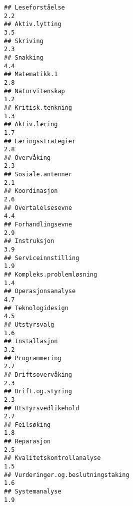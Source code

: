 \documentclass[
]{article}
\begin{document}
\begin{verbatim}
## Leseforståelse                                                                   2.2
## Aktiv.lytting                                                                    3.5
## Skriving                                                                         2.3
## Snakking                                                                         4.4
## Matematikk.1                                                                     2.8
## Naturvitenskap                                                                   1.2
## Kritisk.tenkning                                                                 1.3
## Aktiv.læring                                                                     1.7
## Læringsstrategier                                                                2.8
## Overvåking                                                                       2.3
## Sosiale.antenner                                                                 2.1
## Koordinasjon                                                                     2.6
## Overtalelsesevne                                                                 4.4
## Forhandlingsevne                                                                 2.9
## Instruksjon                                                                      3.9
## Serviceinnstilling                                                               1.9
## Kompleks.problemløsning                                                          1.4
## Operasjonsanalyse                                                                4.7
## Teknologidesign                                                                  4.5
## Utstyrsvalg                                                                      1.6
## Installasjon                                                                     3.2
## Programmering                                                                    2.7
## Driftsovervåking                                                                 2.3
## Drift.og.styring                                                                 2.3
## Utstyrsvedlikehold                                                               2.7
## Feilsøking                                                                       1.8
## Reparasjon                                                                       2.5
## Kvalitetskontrollanalyse                                                         1.5
## Vurderinger.og.beslutningstaking                                                 1.6
## Systemanalyse                                                                    1.9

\end{verbatim}
\end{document}

